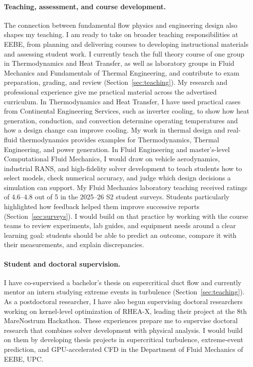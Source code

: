 \documentclass[11pt]{article}
\begin{document}
\paragraph{Teaching, assessment, and course development.}
The connection between fundamental flow physics and engineering design also shapes my teaching. 
I am ready to take on broader teaching responsibilities at EEBE, from planning and delivering courses to developing instructional materials and assessing student work. 
I currently teach the full theory course of one group in Thermodynamics and Heat Transfer, as well as laboratory groups in Fluid Mechanics and Fundamentals of Thermal Engineering, and contribute to exam preparation, grading, and review (Section~\ref{sec:teaching}).
My research and professional experience give me practical material across the advertised curriculum. In Thermodynamics and Heat Transfer, I have used practical cases from Continental Engineering Services, such as inverter cooling, to show how heat generation, conduction, and convection determine operating temperatures and how a design change can improve cooling. 
My work in thermal design and real-fluid thermodynamics provides examples for Thermodynamics, Thermal Engineering, and power generation. 
In Fluid Engineering and master's-level Computational Fluid Mechanics, I would draw on vehicle aerodynamics, industrial RANS, and high-fidelity solver development to teach students how to select models, check numerical accuracy, and judge which design decisions a simulation can support.
My Fluid Mechanics laboratory teaching received ratings of 4.6--4.8 out of 5 in the 2025--26 S2 student surveys. 
Students particularly highlighted how feedback helped them improve successive reports (Section~\ref{sec:surveys}). 
I would build on that practice by working with the course teams to review experiments, lab guides, and equipment needs around a clear learning goal: students should be able to predict
an outcome, compare it with their measurements, and explain discrepancies. 

\paragraph{Student and doctoral supervision.}
I have co-supervised a bachelor's thesis on supercritical duct flow and currently mentor an intern studying extreme events in turbulence (Section~\ref{sec:teaching}). 
As a postdoctoral researcher, I have also begun supervising doctoral researchers working on kernel-level optimization of RHEA-X, leading their project at the 8th MareNostrum Hackathon.
These experiences prepare me to supervise doctoral research that combines solver development with physical analysis. 
I would build on them by developing thesis projects in supercritical turbulence, extreme-event prediction, and GPU-accelerated CFD in the Department of Fluid Mechanics of EEBE, UPC.
\end{document}
